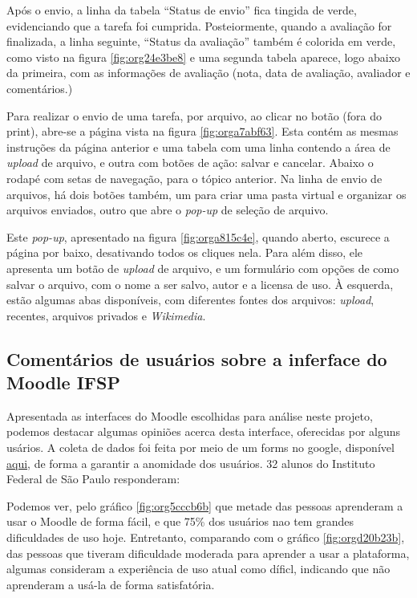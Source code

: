\documentclass[11pt]{article}
\begin{document}
Após o envio, a linha da tabela ``Status de envio'' fica tingida de
verde, evidenciando que a tarefa foi cumprida. Posteiormente, quando a
avaliação for finalizada, a linha seguinte, ``Status da avaliação''
também é colorida em verde, como visto na figura \ref{fig:org24e3be8} e uma
segunda tabela aparece, logo abaixo da primeira, com as informações de
avaliação (nota, data de avaliação, avaliador e comentários.)

Para realizar o envio de uma tarefa, por arquivo, ao clicar no botão
(fora do print), abre-se a página vista na figura \ref{fig:orga7abf63}. Esta
contém as mesmas instruções da página anterior e uma tabela com uma
linha contendo a área de \emph{upload} de arquivo, e outra com botões de
ação: salvar e cancelar. Abaixo o rodapé com setas de navegação, para
o tópico anterior. Na linha de envio de arquivos, há dois botões
também, um para criar uma pasta virtual e organizar os arquivos
enviados, outro que abre o \emph{pop-up} de seleção de arquivo.

Este \emph{pop-up}, apresentado na figura \ref{fig:orga815c4e}, quando aberto,
escurece a página por baixo, desativando todos os cliques nela.  Para
além disso, ele apresenta um botão de \emph{upload} de arquivo, e um
formulário com opções de como salvar o arquivo, com o nome a ser
salvo, autor e a licensa de uso. À esquerda, estão algumas abas
disponíveis, com diferentes fontes dos arquivos: \emph{upload}, recentes,
arquivos privados e \emph{Wikimedia}.


\subsection*{Comentários de usuários sobre a inferface do Moodle IFSP}
\label{sec:orgc29ddcb}
Apresentada as interfaces do Moodle escolhidas para análise neste
projeto, podemos destacar algumas opiniões acerca desta interface,
oferecidas por alguns usários. A coleta de dados foi feita por meio de
um forms no google, disponível \href{https://forms.gle/U3KtLT2xPk4pn2q5A}{aqui}, de forma a garantir a anomidade
dos usuários. 32 alunos do Instituto Federal de São Paulo responderam:

Podemos ver, pelo gráfico \ref{fig:org5cccb6b} que metade das pessoas
aprenderam a usar o Moodle de forma fácil, e que 75\% dos usuários nao
tem grandes dificuldades de uso hoje.  Entretanto, comparando com o
gráfico \ref{fig:orgd20b23b}, das pessoas que tiveram dificuldade moderada para
aprender a usar a plataforma, algumas consideram a experiência de uso
atual como díficl, indicando que não aprenderam a usá-la de forma
satisfatória.
\end{document}
